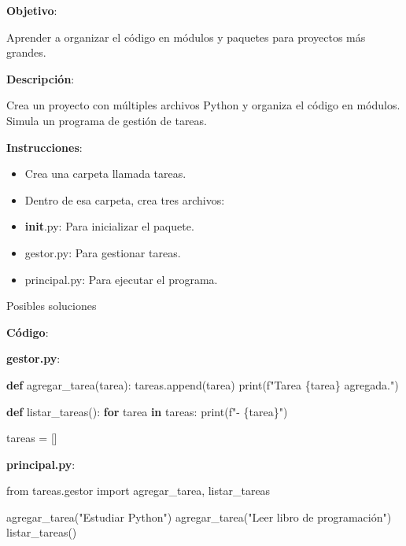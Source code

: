 \documentclass[
  a4paper,
  DIV=11,
  numbers=noendperiod,
  onepage,
  openany]{scrreprt}
\newenvironment{Shaded}{\begin{snugshade}}{\end{snugshade}}
\newcommand{\BuiltInTok}[1]{\textcolor[rgb]{0.00,0.23,0.31}{#1}}
\newcommand{\ControlFlowTok}[1]{\textcolor[rgb]{0.00,0.23,0.31}{\textbf{#1}}}
\newcommand{\ImportTok}[1]{\textcolor[rgb]{0.00,0.46,0.62}{#1}}
\newcommand{\KeywordTok}[1]{\textcolor[rgb]{0.00,0.23,0.31}{\textbf{#1}}}
\newcommand{\NormalTok}[1]{\textcolor[rgb]{0.00,0.23,0.31}{#1}}
\newcommand{\OperatorTok}[1]{\textcolor[rgb]{0.37,0.37,0.37}{#1}}
\newcommand{\SpecialCharTok}[1]{\textcolor[rgb]{0.37,0.37,0.37}{#1}}
\newcommand{\SpecialStringTok}[1]{\textcolor[rgb]{0.13,0.47,0.30}{#1}}
\newcommand{\StringTok}[1]{\textcolor[rgb]{0.13,0.47,0.30}{#1}}
\begin{document}
\textbf{Objetivo}:

Aprender a organizar el código en módulos y paquetes para proyectos más
grandes.

\textbf{Descripción}:

Crea un proyecto con múltiples archivos Python y organiza el código en
módulos. Simula un programa de gestión de tareas.

\textbf{Instrucciones}:

\begin{itemize}
\item
  Crea una carpeta llamada tareas.
\item
  Dentro de esa carpeta, crea tres archivos:
\item
  \textbf{init}.py: Para inicializar el paquete.
\item
  gestor.py: Para gestionar tareas.
\item
  principal.py: Para ejecutar el programa.
\end{itemize}

Posibles soluciones

\textbf{Código}:

\textbf{gestor.py}:

\begin{Shaded}
\begin{Highlighting}[]
\KeywordTok{def}\NormalTok{ agregar\_tarea(tarea):}
\NormalTok{    tareas.append(tarea)}
    \BuiltInTok{print}\NormalTok{(}\SpecialStringTok{f"Tarea \textquotesingle{}}\SpecialCharTok{\{}\NormalTok{tarea}\SpecialCharTok{\}}\SpecialStringTok{\textquotesingle{} agregada."}\NormalTok{)}
    
\KeywordTok{def}\NormalTok{ listar\_tareas():}
    \ControlFlowTok{for}\NormalTok{ tarea }\KeywordTok{in}\NormalTok{ tareas:}
        \BuiltInTok{print}\NormalTok{(}\SpecialStringTok{f"{-} }\SpecialCharTok{\{}\NormalTok{tarea}\SpecialCharTok{\}}\SpecialStringTok{"}\NormalTok{)}

\NormalTok{tareas }\OperatorTok{=}\NormalTok{ []}
\end{Highlighting}
\end{Shaded}

\textbf{principal.py}:

\begin{Shaded}
\begin{Highlighting}[]
\ImportTok{from}\NormalTok{ tareas.gestor }\ImportTok{import}\NormalTok{ agregar\_tarea, listar\_tareas}

\NormalTok{agregar\_tarea(}\StringTok{"Estudiar Python"}\NormalTok{)}
\NormalTok{agregar\_tarea(}\StringTok{"Leer libro de programación"}\NormalTok{)}
\NormalTok{listar\_tareas()}
\end{Highlighting}
\end{Shaded}
\end{document}
